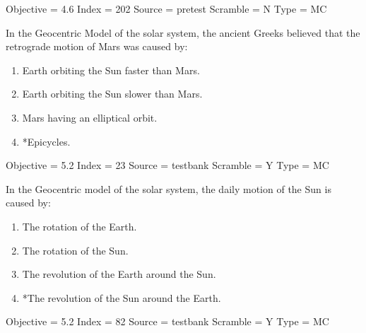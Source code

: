 \documentclass[11pt]{article}
\begin{document}
\begin{enumerate}
\begin{minipage}{\textwidth}
\begin{minipage}{\textwidth}
Objective = 4.6
Index = 202
Source = pretest
Scramble = N
Type = MC
\end{minipage}
\end{minipage}
\vskip 0.20in

\begin{minipage}{\textwidth}
\begin{minipage}{\textwidth}
\item In the Geocentric Model of the solar system, the ancient Greeks believed that the retrograde motion of Mars was caused by:
\begin{enumerate} 
\setlength{\itemsep}{1pt} 
\setlength{\parskip}{0pt} 
\setlength{\parsep}{0pt}
\setlength{\multicolsep}{1pt} 
\item Earth orbiting the Sun faster than Mars.
\item Earth orbiting the Sun slower than Mars.
\item Mars having an elliptical orbit.
\item *Epicycles.
\end{enumerate} 
Objective = 5.2
Index = 23
Source = testbank
Scramble = Y
Type = MC
\end{minipage}
\end{minipage}
\vskip 0.20in

\begin{minipage}{\textwidth}
\begin{minipage}{\textwidth}
\item In the Geocentric model of the solar system, the daily motion of the Sun is caused by:
\begin{enumerate} 
\setlength{\itemsep}{1pt} 
\setlength{\parskip}{0pt} 
\setlength{\parsep}{0pt}
\setlength{\multicolsep}{1pt} 
\item The rotation of the Earth.
\item The rotation of the Sun.
\item The revolution of the Earth around the Sun.
\item *The revolution of the Sun around the Earth.
\end{enumerate} 
Objective = 5.2
Index = 82
Source = testbank
Scramble = Y
Type = MC
\end{minipage}
\end{minipage}
\vskip 0.20in


\end{enumerate}
\end{document}
